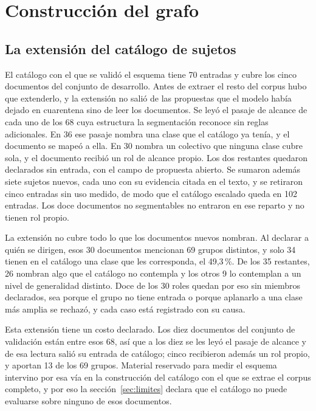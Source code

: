 \documentclass[12pt,a4paper]{report}
\begin{document}
\chapter{Construcción del grafo}
\label{cap:construccion}

\section{La extensión del catálogo de sujetos}
\label{sec:extension_catalogo}

El catálogo con el que se validó el esquema tiene 70 entradas y cubre los cinco documentos del conjunto de desarrollo. Antes de extraer el resto del corpus hubo que extenderlo, y la extensión no salió de las propuestas que el modelo había dejado en cuarentena sino de leer los documentos. Se leyó el pasaje de alcance de cada uno de los 68 cuya estructura la segmentación reconoce sin reglas adicionales. En 36 ese pasaje nombra una clase que el catálogo ya tenía, y el documento se mapeó a ella. En 30 nombra un colectivo que ninguna clase cubre sola, y el documento recibió un rol de alcance propio. Los dos restantes quedaron declarados sin entrada, con el campo de propuesta abierto. Se sumaron además siete sujetos nuevos, cada uno con su evidencia citada en el texto, y se retiraron cinco entradas sin uso medido, de modo que el catálogo escalado queda en 102 entradas. Los doce documentos no segmentables no entraron en ese reparto y no tienen rol propio.

La extensión no cubre todo lo que los documentos nuevos nombran. Al declarar a quién se dirigen, esos 30 documentos mencionan 69 grupos distintos, y solo 34 tienen en el catálogo una clase que les corresponda, el 49,3\,\%. De los 35 restantes, 26 nombran algo que el catálogo no contempla y los otros 9 lo contemplan a un nivel de generalidad distinto. Doce de los 30 roles quedan por eso sin miembros declarados, sea porque el grupo no tiene entrada o porque aplanarlo a una clase más amplia se rechazó, y cada caso está registrado con su causa.

Esta extensión tiene un costo declarado. Los diez documentos del conjunto de validación están entre esos 68, así que a los diez se les leyó el pasaje de alcance y de esa lectura salió su entrada de catálogo; cinco recibieron además un rol propio, y aportan 13 de los 69 grupos. Material reservado para medir el esquema intervino por esa vía en la construcción del catálogo con el que se extrae el corpus completo, y por eso la sección~\ref{sec:limites} declara que el catálogo no puede evaluarse sobre ninguno de esos documentos.
\end{document}
